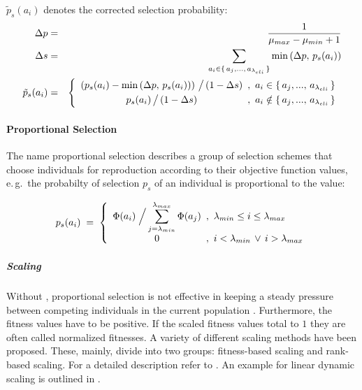 \smallskip
\noindent $\tilde p_s(a_i)$ denotes the corrected selection probability:
\begin{eqnarray}
  \Delta p & = & \frac{1}{\mu_{max} - \mu_{min} + 1} \\
  \Delta s & = & \sum_{a_i \in \{\,a_j,...,\,a_{\lambda_{eli}}\,\}}
    \min\left(\Delta p,\,p_s(a_i)\right) \\
  \tilde p_s(a_i) & = & \left\{
    \begin{array}{c@{\hspace{0.5em},\hspace{0.5em}}l}
      \left(p_s(a_i) - \min\left(\Delta p,\,p_s(a_i)\right)
      \right)\,\big/\,(1-\Delta s)
        & a_i \in \{\,a_j,...,\,a_{\lambda_{eli}}\,\} \\[0.3em]
      p_s(a_i)\,\big/\,(1-\Delta s)
        & a_i \notin \{\,a_j,...,\,a_{\lambda_{eli}}\,\}
    \end{array}
  \right.
\end{eqnarray}


        \paragraph{Proportional Selection}

The name  proportional selection describes a group of
selection schemes that choose individuals for reproduction according
to their objective function values, e.\,g.\ the probabilty of selection
$p_s$ of an individual is proportional to the value:

\begin{equation}
  p_s(a_i) \; = \; \left\{
    \begin{array}{c@{\hspace{0.5em},\hspace{0.5em}}l}
      \Phi(a_i) \; \Big/ \displaystyle\sum_{j=\lambda_{min}}^{\lambda_{max}}\Phi(a_j)
        & \lambda_{min} \le i \le \lambda_{max} \\[0.3em]
      0 & i < \lambda_{min} \, \vee \, i > \lambda_{max}
    \end{array}
  \right.
\end{equation}


\subparagraph{Scaling} %

Without , proportional selection is not effective in
keeping a steady pressure between competing individuals in the current
population \cite{Goldberg:91}. Furthermore, the fitness values have to
be positive.  If the scaled fitness values total to $1$ they are often
called normalized fitnesses.  A variety of different scaling methods
have been proposed.
These, mainly, divide into two groups: fitness-based scaling and
rank-based scaling.
For a detailed description refer to
\cite{Grefenstette:89,Baeck:94}.
An example for linear dynamic scaling
is outlined in .

